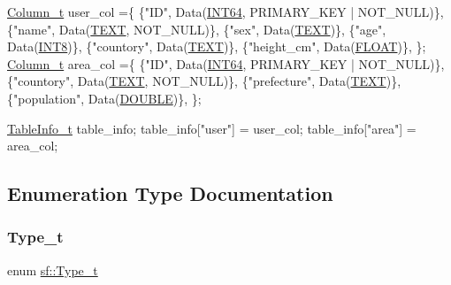 \begin{DoxyCode}
\hyperlink{namespacesf_a390d6a976138adf32ace872bbd298a30}{Column\_t} user\_col =\{
    \{\textcolor{stringliteral}{"ID"}, Data(\hyperlink{namespacesf_aee849ddcdbf3bdb22d912e4ab0c7b93fa2c9e1474c273bc300e25ba8f0433b835}{INT64}, PRIMARY\_KEY | NOT\_NULL)\},
    \{\textcolor{stringliteral}{"name"}, Data(\hyperlink{namespacesf_aee849ddcdbf3bdb22d912e4ab0c7b93fa193ac55158642f32159ca4b9e7b07c04}{TEXT}, NOT\_NULL)\},
    \{\textcolor{stringliteral}{"sex"}, Data(\hyperlink{namespacesf_aee849ddcdbf3bdb22d912e4ab0c7b93fa193ac55158642f32159ca4b9e7b07c04}{TEXT})\},
    \{\textcolor{stringliteral}{"age"}, Data(\hyperlink{namespacesf_aee849ddcdbf3bdb22d912e4ab0c7b93fae0641bead659e4a57e95d5b11ffbb75e}{INT8})\},
    \{\textcolor{stringliteral}{"countory"}, Data(\hyperlink{namespacesf_aee849ddcdbf3bdb22d912e4ab0c7b93fa193ac55158642f32159ca4b9e7b07c04}{TEXT})\},
    \{\textcolor{stringliteral}{"height\_cm"}, Data(\hyperlink{namespacesf_aee849ddcdbf3bdb22d912e4ab0c7b93fa38c57655742536a74f83bb6ae7f29dbb}{FLOAT})\},
\};
\hyperlink{namespacesf_a390d6a976138adf32ace872bbd298a30}{Column\_t} area\_col =\{
    \{\textcolor{stringliteral}{"ID"}, Data(\hyperlink{namespacesf_aee849ddcdbf3bdb22d912e4ab0c7b93fa2c9e1474c273bc300e25ba8f0433b835}{INT64}, PRIMARY\_KEY | NOT\_NULL)\},
    \{\textcolor{stringliteral}{"countory"}, Data(\hyperlink{namespacesf_aee849ddcdbf3bdb22d912e4ab0c7b93fa193ac55158642f32159ca4b9e7b07c04}{TEXT}, NOT\_NULL)\},
    \{\textcolor{stringliteral}{"prefecture"}, Data(\hyperlink{namespacesf_aee849ddcdbf3bdb22d912e4ab0c7b93fa193ac55158642f32159ca4b9e7b07c04}{TEXT})\},
    \{\textcolor{stringliteral}{"population"}, Data(\hyperlink{namespacesf_aee849ddcdbf3bdb22d912e4ab0c7b93faec58a0ab7843e2405f7e17d488276ec1}{DOUBLE})\},
\};

\hyperlink{namespacesf_a4427debefb8b5121ea783ab2a93a8e50}{TableInfo\_t} table\_info;
table\_info[\textcolor{stringliteral}{"user"}] = user\_col;
table\_info[\textcolor{stringliteral}{"area"}] = area\_col;
\end{DoxyCode}
 

\subsection{Enumeration Type Documentation}
\mbox{\label{namespacesf_aee849ddcdbf3bdb22d912e4ab0c7b93f}} 
\subsubsection{\texorpdfstring{Type\+\_\+t}{Type\_t}}
{\footnotesize\ttfamily enum \hyperlink{namespacesf_aee849ddcdbf3bdb22d912e4ab0c7b93f}{sf\+::\+Type\+\_\+t}}



